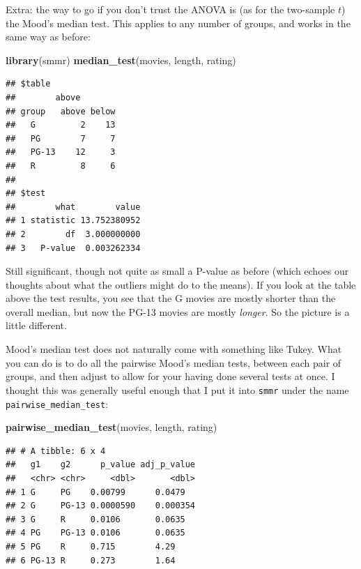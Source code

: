 \documentclass[]{tufte-book}
\newenvironment{Shaded}{}{}
\newcommand{\KeywordTok}[1]{\textcolor[rgb]{0.00,0.44,0.13}{\textbf{#1}}}
\newcommand{\NormalTok}[1]{#1}
\theoremstyle{definition}
\theoremstyle{definition}
\theoremstyle{definition}
\theoremstyle{remark}
\begin{document}
Extra: the way to go if you don't trust the ANOVA is (as for the
two-sample \(t\)) the Mood's median test. This applies to any number of
groups, and works in the same way as before:

\begin{Shaded}
\begin{Highlighting}[]
\KeywordTok{library}\NormalTok{(smmr)}
\KeywordTok{median_test}\NormalTok{(movies, length, rating)}
\end{Highlighting}
\end{Shaded}

\begin{verbatim}
## $table
##        above
## group   above below
##   G         2    13
##   PG        7     7
##   PG-13    12     3
##   R         8     6
## 
## $test
##        what        value
## 1 statistic 13.752380952
## 2        df  3.000000000
## 3   P-value  0.003262334
\end{verbatim}

Still significant, though not quite as small a P-value as before (which
echoes our thoughts about what the outliers might do to the means). If
you look at the table above the test results, you see that the G movies
are mostly shorter than the overall median, but now the PG-13 movies are
mostly \emph{longer}. So the picture is a little different.

Mood's median test does not naturally come with something like Tukey.
What you can do is to do all the pairwise Mood's median tests, between
each pair of groups, and then adjust to allow for your having done
several tests at once. I thought this was generally useful enough that I
put it into \texttt{smmr} under the name
\texttt{pairwise\_median\_test}:

\begin{Shaded}
\begin{Highlighting}[]
\KeywordTok{pairwise_median_test}\NormalTok{(movies, length, rating)}
\end{Highlighting}
\end{Shaded}

\begin{verbatim}
## # A tibble: 6 x 4
##   g1    g2      p_value adj_p_value
##   <chr> <chr>     <dbl>       <dbl>
## 1 G     PG    0.00799      0.0479  
## 2 G     PG-13 0.0000590    0.000354
## 3 G     R     0.0106       0.0635  
## 4 PG    PG-13 0.0106       0.0635  
## 5 PG    R     0.715        4.29    
## 6 PG-13 R     0.273        1.64
\end{verbatim}
\end{document}
